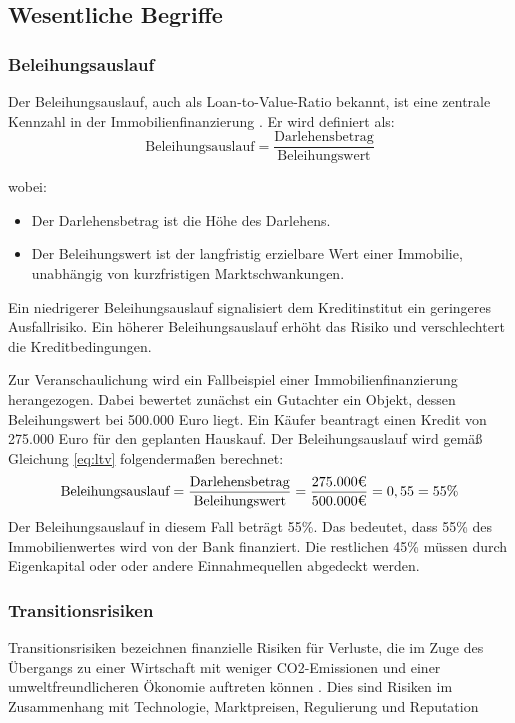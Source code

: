 
\subsection{Wesentliche Begriffe}
\subsubsection{Beleihungsauslauf}
Der Beleihungsauslauf, auch als Loan-to-Value-Ratio bekannt, ist eine zentrale Kennzahl in der Immobilienfinanzierung \parencite{BelWertV_3}. Er wird definiert als:
\begin{equation}
    \text{Beleihungsauslauf} = \frac{\text{Darlehensbetrag}}{\text{Beleihungswert}}
    \label{eq:ltv}
\end{equation}

\noindent wobei:
\begin{itemize}
    \item Der Darlehensbetrag ist die Höhe des Darlehens.
    \item Der Beleihungswert ist der langfristig erzielbare Wert einer Immobilie, unabhängig von kurzfristigen Marktschwankungen.
\end{itemize}

Ein niedrigerer Beleihungsauslauf signalisiert dem Kreditinstitut ein geringeres Ausfallrisiko. Ein höherer Beleihungsauslauf erhöht das Risiko und verschlechtert die Kreditbedingungen.

Zur Veranschaulichung wird ein Fallbeispiel einer Immobilienfinanzierung herangezogen. Dabei bewertet zunächst ein Gutachter ein Objekt, dessen Beleihungswert bei 500.000 Euro liegt. Ein Käufer beantragt einen Kredit von 275.000 Euro für den geplanten Hauskauf.
Der Beleihungsauslauf wird gemäß Gleichung \ref{eq:ltv} folgendermaßen berechnet:
\begin{equation}
    \text{Beleihungsauslauf} = \frac{\text{Darlehensbetrag}}{\text{Beleihungswert}} = \frac{275.000 \mbox{\texteuro}}{500.000 \mbox{\texteuro}} = 0,55 = 55\%
\end{equation}
Der Beleihungsauslauf in diesem Fall beträgt 55\%. Das bedeutet, dass 55\% des Immobilienwertes wird von der Bank finanziert. Die restlichen 45\% müssen durch Eigenkapital oder oder andere Einnahmequellen abgedeckt werden.
\subsubsection{Transitionsrisiken}
Transitionsrisiken bezeichnen finanzielle Risiken für Verluste, die im Zuge des Übergangs zu einer Wirtschaft mit weniger CO2-Emissionen und einer umweltfreundlicheren Ökonomie auftreten können \parencite{ecb2020climate}. Dies sind Risiken im Zusammenhang mit Technologie, Marktpreisen, Regulierung und Reputation


